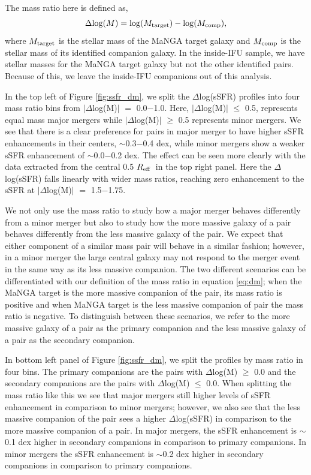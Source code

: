 \documentclass[apj,twocolumn]{emulateapj}
\newcommand{\reff}{$R_{\rm eff}$}
\begin{document}
\begin{CJK*}{UTF8}{gbsn}
The mass ratio here is defined as, 
\begin{equation}\label{eq:dm}
\Delta {\rm log}(M) = {\rm log}(M_{\rm target}) - {\rm log}(M_{\rm comp}),
\end{equation}
where $M_{\rm target}$ is the stellar mass of the MaNGA target galaxy and $M_{\rm comp}$ is the stellar mass of its identified companion galaxy. In the inside-IFU sample, we have stellar masses for the MaNGA target galaxy but not the other identified pairs. Because of this, we leave the inside-IFU companions out of this analysis.

In the top left of Figure \ref{fig:ssfr_dm}, we split the $\Delta$log(sSFR) profiles into four mass ratio bins from $|\Delta$log(M)$|$ $=$ 0.0$-$1.0. Here, $|\Delta$log(M)$|$ $\le$ 0.5, represents equal mass major mergers while $|\Delta$log(M)$|$ $\ge$ 0.5 represents minor mergers. We see that there is a clear preference for pairs in major merger to have higher sSFR enhancements in their centers, $\sim$0.3$-$0.4 dex, while minor mergers show a weaker sSFR enhancement of $\sim$0.0$-$0.2 dex. The effect can be seen more clearly with the data extracted from the central 0.5 \reff\ in the top right panel. Here the $\Delta$log(sSFR) falls linearly with wider mass ratios, reaching zero enhancement to the sSFR at $|\Delta$log(M)$|$ $=$ 1.5$-$1.75.

We not only use the mass ratio to study how a major merger behaves differently from a minor merger but also to study how the more massive galaxy of a pair behaves differently from the less massive galaxy of the pair. We expect that either component of a similar mass pair will behave in a similar fashion; however, in a minor merger the large central galaxy may not respond to the merger event in the same way as its less massive companion. The two different scenarios can be differentiated with our definition of the mass ratio in equation \ref{eq:dm}; when the MaNGA target is the more massive companion of the pair, its mass ratio is positive and when MaNGA target is the less massive companion of pair the mass ratio is negative. To distinguish between these scenarios, we refer to the more massive galaxy of a pair as the primary companion and the less massive galaxy of a pair as the secondary companion.

In bottom left panel of Figure \ref{fig:ssfr_dm}, we split the profiles by mass ratio in four bins. The primary companions are the pairs with $\Delta$log(M) $\ge$ 0.0 and the secondary companions are the pairs with $\Delta$log(M) $\le$ 0.0. When splitting the mass ratio like this we see that major mergers still higher levels of sSFR enhancement in comparison to minor mergers; however, we also see that the less massive companion of the pair sees a higher $\Delta$log(sSFR) in comparison to the more massive companion of a pair. In major mergers, the sSFR enhancement is $\sim$0.1 dex higher in secondary companions in comparison to primary companions. In minor mergers the sSFR enhancement is $\sim$0.2 dex higher in secondary companions in comparison to primary companions.


\end{CJK*}
\end{document}
